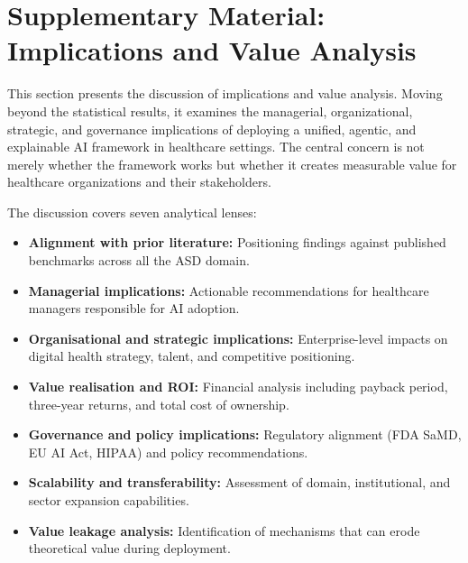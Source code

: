 
\label{app:ch4_discussion_appx}
\label{app_j:discussion}

\section{Supplementary Material: Implications and Value Analysis}

This section presents the discussion of implications and value analysis. Moving beyond the statistical results, it examines the managerial, organizational, strategic, and governance implications of deploying a unified, agentic, and explainable AI framework in healthcare settings. The central concern is not merely whether the framework works but whether it creates measurable value for healthcare organizations and their stakeholders.

The discussion covers seven analytical lenses:

\begin{itemize}[leftmargin=*, itemsep=3pt]
    \item \textbf{Alignment with prior literature:} Positioning findings against published benchmarks across all the ASD domain.
    \item \textbf{Managerial implications:} Actionable recommendations for healthcare managers responsible for AI adoption.
    \item \textbf{Organisational and strategic implications:} Enterprise-level impacts on digital health strategy, talent, and competitive positioning.
    \item \textbf{Value realisation and ROI:} Financial analysis including payback period, three-year returns, and total cost of ownership.
    \item \textbf{Governance and policy implications:} Regulatory alignment (FDA SaMD, EU AI Act, HIPAA) and policy recommendations.
    \item \textbf{Scalability and transferability:} Assessment of domain, institutional, and sector expansion capabilities.
    \item \textbf{Value leakage analysis:} Identification of mechanisms that can erode theoretical value during deployment.
\end{itemize}

